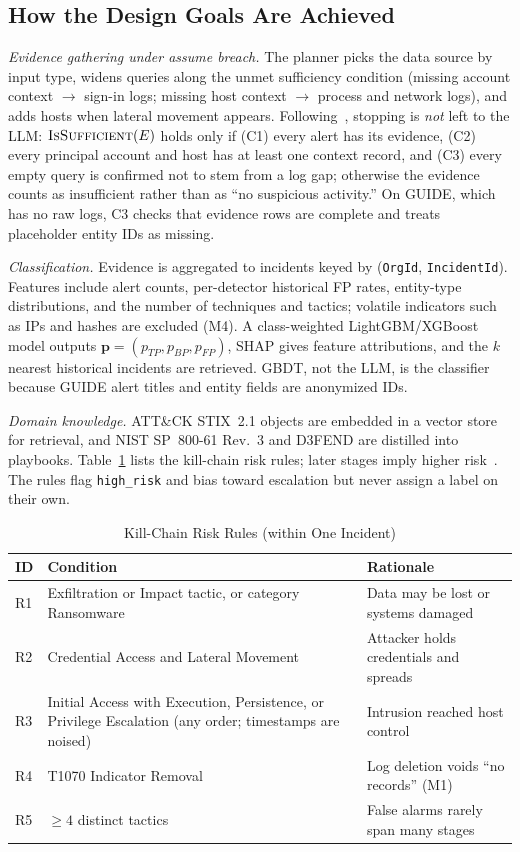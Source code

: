 \documentclass[conference]{IEEEtran}
\begin{document}
\subsection{How the Design Goals Are Achieved}
\emph{Evidence gathering under assume breach.} The planner picks the
data source by input type, widens queries along the unmet sufficiency
condition (missing account context $\rightarrow$ sign-in logs; missing
host context $\rightarrow$ process and network logs), and adds hosts
when lateral movement appears. Following~\cite{tsegai2026}, stopping is
\emph{not} left to the LLM: $\textsc{IsSufficient}(E)$ holds only if
(C1) every alert has its evidence, (C2) every principal account and
host has at least one context record, and (C3) every empty query is
confirmed not to stem from a log gap; otherwise the evidence counts as
insufficient rather than as ``no suspicious activity.'' On GUIDE, which
has no raw logs, C3 checks that evidence rows are complete and treats
placeholder entity IDs as missing.

\emph{Classification.} Evidence is aggregated to incidents keyed by
(\texttt{OrgId}, \texttt{IncidentId}). Features include alert counts,
per-detector historical FP rates, entity-type distributions, and the
number of techniques and tactics; volatile indicators such as IPs and
hashes are excluded (M4). A class-weighted LightGBM/XGBoost model
outputs $\mathbf{p}=(p_{TP},p_{BP},p_{FP})$, SHAP gives feature
attributions, and the $k$ nearest historical incidents are retrieved.
GBDT, not the LLM, is the classifier because GUIDE alert titles and
entity fields are anonymized IDs.

\emph{Domain knowledge.} ATT\&CK STIX~2.1 objects are embedded in a
vector store for retrieval, and NIST SP~800-61 Rev.~3 and D3FEND are
distilled into playbooks. Table~\ref{tab:rules} lists the kill-chain
risk rules; later stages imply higher risk~\cite{sadlek2025,garcia2025rosca}.
The rules flag \texttt{high\_risk} and bias toward escalation but never
assign a label on their own.

\begin{table}[t]
\caption{Kill-Chain Risk Rules (within One Incident)}
\label{tab:rules}
\centering
\footnotesize
\setlength{\tabcolsep}{3pt}
\begin{tabular}{@{}p{0.5cm}p{3.7cm}p{3.5cm}@{}}
\toprule
\textbf{ID} & \textbf{Condition} & \textbf{Rationale} \\
\midrule
R1 & Exfiltration or Impact tactic, or category Ransomware
   & Data may be lost or systems damaged \\
R2 & Credential Access and Lateral Movement
   & Attacker holds credentials and spreads \\
R3 & Initial Access with Execution, Persistence, or Privilege
     Escalation (any order; timestamps are noised)
   & Intrusion reached host control \\
R4 & T1070 Indicator Removal
   & Log deletion voids ``no records'' (M1) \\
R5 & $\geq 4$ distinct tactics
   & False alarms rarely span many stages \\
\bottomrule
\end{tabular}
\end{table}
\end{document}
